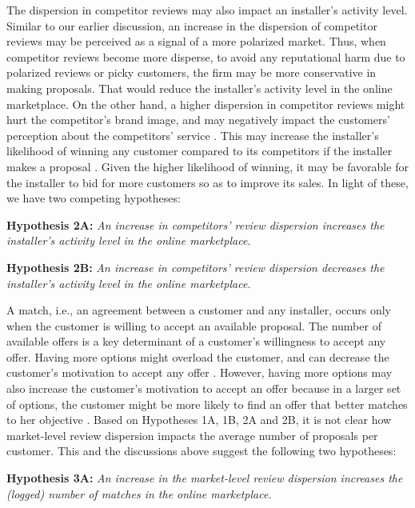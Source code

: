 \documentclass[msom,blindrev]{informs3}
\begin{document}
	The dispersion in competitor reviews may also impact an installer's activity level. Similar to our earlier discussion, an increase in the dispersion of competitor reviews may be perceived as a signal of a more polarized market. Thus, when competitor reviews become more disperse, to avoid any reputational harm due to polarized reviews or picky customers, the firm may be more conservative in making proposals. That would reduce the installer's activity level in the online marketplace. On the other hand, a higher dispersion in competitor reviews might hurt the competitor's brand image, and may negatively impact the customers' perception about the competitors' service \citep{chakraborty2018credibility,chakraborty2018effects,Zhu}. This may increase the installer's likelihood of winning any customer compared to its competitors if the installer makes a proposal \citep{demirag2011risks,moreno2014doing}. Given the higher likelihood of winning, it may be favorable for the installer to bid for more customers so as to improve its sales. In light of these, we have two competing hypotheses:
	
	
	\noindent\textbf{Hypothesis 2A:} \emph{An increase in competitors' review dispersion increases the installer's activity level in the online marketplace.}
	
	\noindent\textbf{Hypothesis 2B:} \emph{An increase in competitors' review dispersion decreases the installer's activity level in the online marketplace.}
	
	A match, i.e., an agreement between a customer and any installer, occurs only when the customer is willing to accept an available proposal. The number of available offers is a key determinant of a customer's willingness to accept any offer. Having more options might overload the customer, and can decrease the customer's motivation to accept any offer \citep{scheibehenne2010can,iyengar2000choice}. However, having more options may also increase the customer's motivation to accept an offer because in a larger set of options, the customer  might be more likely to find an offer that better matches to her objective \citep{scheibehenne2010can,baumol1956variety}. Based on Hypotheses 1A, 1B, 2A and 2B, it is not clear how market-level review dispersion impacts the average number of proposals per customer. This and the discussions above  suggest the following two hypotheses:
	
	
	\noindent\textbf{Hypothesis 3A:} \emph{An increase in the market-level review dispersion increases the (logged) number of matches in the online marketplace.}
	
\end{document}
